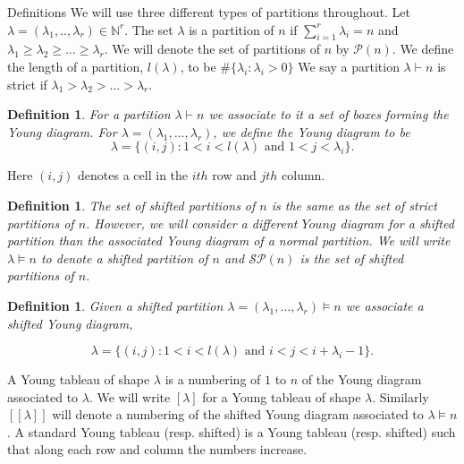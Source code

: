 \documentclass[a4paper,10pt]{amsart}
\newtheorem{definition}[theorem]{Definition}
\newtheorem{example}[theorem]{Example}
\begin{document}
\begin{section}{Definitions}
We will use three different types of partitions throughout. Let $\lambda = (\lambda_1,..,\lambda_r) \in \mathbb{N}^r$. The set $\lambda$ is a partition of $n$ if $\sum_{i=1}^r \lambda_i = n$ and $\lambda_1\geq \lambda_2 \geq \ldots \geq \lambda_r$. We will denote the set of partitions of $n$ by $\mathcal{P}(n)$. We define the length of a partition, $l(\lambda)$, to be $\#\{\lambda_i : \lambda_i > 0\}$
We say a partition $\lambda \vdash n$ is strict if $\lambda_1>\lambda_2>\ldots >\lambda_r$.
\begin{definition} For a partition $\lambda \vdash n$ we associate to it a set of boxes forming the Young diagram. 
For $\lambda = (\lambda_1,\ldots ,\lambda_r)$, we define the Young diagram to be 
$$\lambda = \{ (i,j) : 1 < i < l(\lambda) \text{ and } 1< j < \lambda_i \}.$$ \end{definition}
Here $(i,j)$ denotes a cell in the $ith$ row and $jth$ column. 
\begin{definition} The set of shifted partitions of $n$ is the same as the set of strict partitions of $n$. However, we will consider a different $Young$ diagram for a shifted partition than the associated Young diagram of a normal partition. We will write $\lambda \vDash n$ to denote a shifted partition of $n$ and $\mathcal{SP}(n)$ is the set of shifted partitions of $n$. \end{definition} 

\begin{definition} Given a shifted partition $\lambda = (\lambda_1,\ldots ,\lambda_r) \vDash n$ we associate a shifted Young diagram,

$$\lambda = \{ (i,j) : 1 < i < l(\lambda) \text{ and } i< j < i+ \lambda_i -1 \}.$$

 \end{definition} 

  A Young tableau of shape $\lambda$ is a numbering of $1$ to $n$ of the Young diagram associated to $\lambda$. We will write $[\lambda]$ for a Young tableau of shape $\lambda$. Similarly 
  $[[\lambda]]$ will denote a numbering of the shifted Young diagram associated to $\lambda \vDash n$. A standard Young tableau (resp. shifted) is a Young tableau (resp. shifted) such that along each row and column the numbers increase. 

\end{section}
\end{document}
